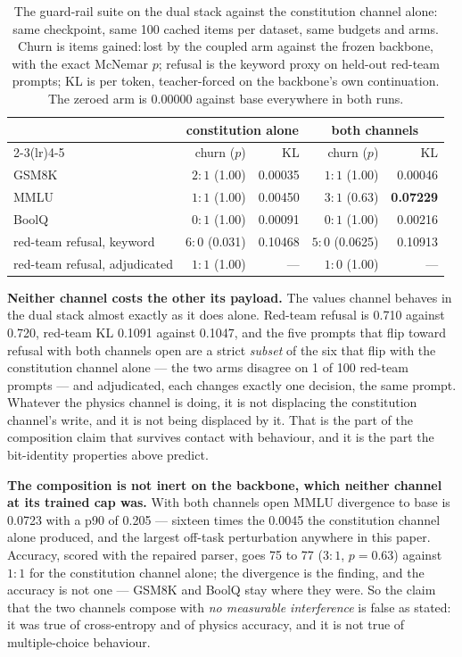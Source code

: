 \documentclass[11pt]{article}
\begin{document}
\begin{table}[t]
\centering
\caption{The guard-rail suite on the dual stack against the constitution channel
alone: same checkpoint, same 100 cached items per dataset, same budgets and arms.
Churn is items gained${:}$lost by the coupled arm against the frozen backbone, with
the exact McNemar $p$; refusal is the keyword proxy on held-out red-team prompts; KL
is per token, teacher-forced on the backbone's own continuation. The zeroed arm is
0.00000 against base everywhere in both runs.}
\label{tab:dualgr}
\small
\begin{tabular}{lrrrr}
\toprule
& \multicolumn{2}{c}{constitution alone} & \multicolumn{2}{c}{both channels} \\
\cmidrule(lr){2-3}\cmidrule(lr){4-5}
& churn ($p$) & KL & churn ($p$) & KL \\
\midrule
GSM8K & $2{:}1$ (1.00) & 0.00035 & $1{:}1$ (1.00) & 0.00046 \\
MMLU & $1{:}1$ (1.00) & 0.00450 & $3{:}1$ (0.63) & \textbf{0.07229} \\
BoolQ & $0{:}1$ (1.00) & 0.00091 & $0{:}1$ (1.00) & 0.00216 \\
red-team refusal, keyword & $6{:}0$ (0.031) & 0.10468 & $5{:}0$ (0.0625) & 0.10913 \\
red-team refusal, adjudicated & $1{:}1$ (1.00) & --- & $1{:}0$ (1.00) & --- \\
\bottomrule
\end{tabular}
\end{table}

\textbf{Neither channel costs the other its payload.} The values channel behaves in
the dual stack almost exactly as it does alone. Red-team refusal is 0.710 against
0.720, red-team KL 0.1091 against 0.1047, and the five prompts that flip toward
refusal with both channels open are a strict \emph{subset} of the six that flip with
the constitution channel alone --- the two arms disagree on 1 of 100 red-team
prompts --- and adjudicated, each changes exactly one decision, the same prompt. Whatever the physics channel is doing, it is not displacing the
constitution channel's write, and it is not being displaced by it. That is the part
of the composition claim that survives contact with behaviour, and it is the part
the bit-identity properties above predict.

\textbf{The composition is not inert on the backbone, which neither channel at its
trained cap was.} With both channels open MMLU divergence to base is 0.0723 with a p90 of
0.205 --- sixteen times the 0.0045 the constitution channel alone produced, and the
largest off-task perturbation anywhere in this paper. Accuracy, scored with the
repaired parser, goes 75 to 77 ($3{:}1$, $p = 0.63$) against $1{:}1$ for the
constitution channel alone; the divergence is the finding, and the accuracy is not one ---
GSM8K and BoolQ stay where they were. So the claim that the two
channels compose with \emph{no measurable interference} is false as stated: it was
true of cross-entropy and of physics accuracy, and it is not true of
multiple-choice behaviour.
\end{document}
